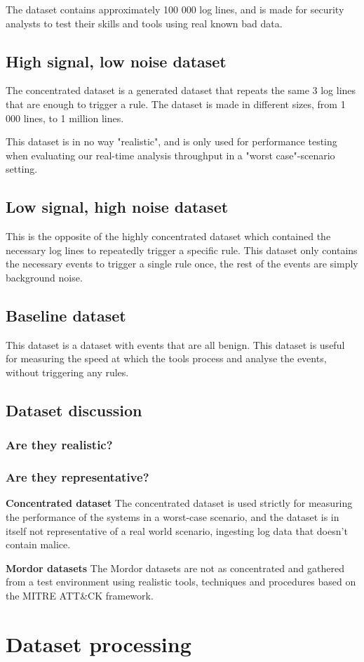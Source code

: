 The dataset contains approximately 100 000 log lines, and is made for security analysts to test their skills and tools using real known bad data.

\subsection{High signal, low noise dataset}
The concentrated dataset is a generated dataset that repeats the same 3 log lines that are enough to trigger a rule. The dataset is made in different sizes, from 1 000 lines, to 1 million lines.

This dataset is in no way "realistic", and is only used for performance testing when evaluating our real-time analysis throughput in a "worst case"-scenario setting.

\subsection{Low signal, high noise dataset}
This is the opposite of the highly concentrated dataset which contained the necessary log lines to repeatedly trigger a specific rule. This dataset only contains the necessary events to trigger a single rule once, the rest of the events are simply background noise.

\subsection{Baseline dataset}
This dataset is a dataset with events that are all benign. This dataset is useful for measuring the speed at which the tools process and analyse the events, without triggering any rules.

\subsection{Dataset discussion}

\subsubsection{Are they realistic?}


\subsubsection{Are they representative?}
\textbf{Concentrated dataset}
The concentrated dataset is used strictly for measuring the performance of the systems in a worst-case scenario, and the dataset is in itself not representative of a real world scenario, ingesting log data that doesn't contain malice.

\textbf{Mordor datasets}
The Mordor datasets are not as concentrated and gathered from a test environment using realistic tools, techniques and procedures based on the MITRE ATT\&CK framework.

\section{Dataset processing}
\label{sec:datasetprocessing}

